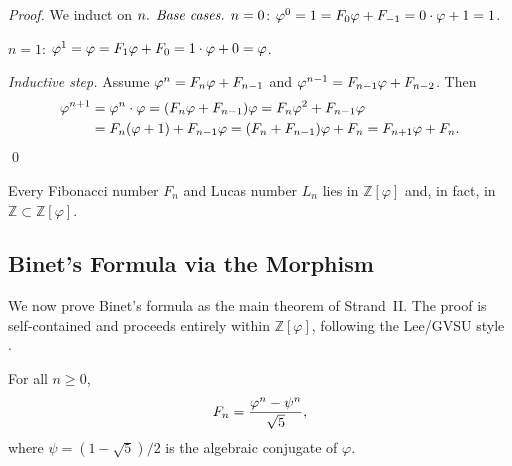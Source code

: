 \begin{proof}
We induct on \(n$.

\emph{Base cases.}
\(n=0\): \(\varphi^{0} = 1 = F_0\varphi + F_{-1} = 0 \cdot \varphi + 1 = 1\). \checkmark

\(n=1\): \(\varphi^{1} = \varphi = F_1\varphi + F_0 = 1\cdot\varphi + 0 = \varphi\). \checkmark

\emph{Inductive step.}
Assume \(\varphi^{n} = F_n\varphi + F_{n-1}\) and
\(\varphi^{n-1} = F_{n-1}\varphi + F_{n-2}\).  Then
\begin{align*}
  \varphi^{n+1} &= \varphi^{n}\cdot\varphi
    = (F_n\varphi + F_{n-1})\varphi
    = F_n\varphi^{2} + F_{n-1}\varphi \\
  &= F_n(\varphi+1) + F_{n-1}\varphi
    = (F_n + F_{n-1})\varphi + F_n
    = F_{n+1}\varphi + F_n.
\end{align*}
\qed
\end{proof}

\begin{corollary}\label{cor:fib-in-ring}
Every Fibonacci number \(F_n\) and Lucas number \(L_n\) lies in
\(\mathbb{Z}[\varphi]\) and, in fact, in \(\mathbb{Z} \subset \mathbb{Z}[\varphi]\).
\end{corollary}

\subsection{Binet's Formula via the Morphism}\label{subsec:ch7-binet}

We now prove Binet's formula as the main theorem of Strand~II.  The proof
is self-contained and proceeds entirely within \(\mathbb{Z}[\varphi]\),
following the Lee/GVSU style \cite{hardy_wright}.

\begin{theorem}\label{thm:binet}
For all \(n \geq 0\),
\[
  F_n = \frac{\varphi^{n} - \psi^n}{\sqrt{5}},
\]
where \(\psi = (1-\sqrt{5})/2\) is the algebraic conjugate of \(\varphi\).
\end{theorem}

